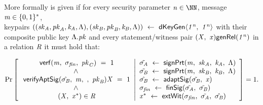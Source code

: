 \begin{definition}[\cnstAptSigCorrectness]
    \label{def:aptSigCorrectness}
    More formally \cnstAptSigCorrectness is given if for every security parameter $\varN \in \cnstNatural$, message $\mathit{m} \in \{0,1\}^{*}$, \\ keypairs
    $((\mathit{sk}_{\mathit{A}}, \mathit{pk}_{\mathit{A}}, \mathit{\mathit{k}_{\mathit{A}}}, \Lambda), (\mathit{sk}_{\mathit{B}}, \mathit{pk}_{\mathit{B}}, \mathit{\mathit{k}_{\mathit{B}}}, \Lambda)) ~\leftarrow~ \mathsf{dKeyGen}\langle \mathit{1^n} ,~ \mathit{1^n} \rangle$
    with their composite public key $\Lambda.\mathit{pk}$
    and every statement/witness pair $(\mathit{X} ,~ \mathit{x}) \mathsf{genRel}(\mathit{1^n})$ in a relation $\mathit{R}$ it must hold that:

    \[
        \Pr\left[
        \begin{array}{c}
            \:\mathsf{verf}(\mathit{m} ,~ \sigma_{\mathit{fin}} ,~ \mathit{pk}_{\mathit{C}}) ~=~ 1                                         \\
            ~\land~                                                                                              \\
            \: \mathsf{verifyAptSig}(\hat{\sigma_{\mathit{B}}} ,~ \mathit{m} ,~  ,~ \mathit{pk}_{\mathit{B}}){\mathit{X}} ~=~ 1             \\
            ~\land~                                                                                              \\
            \:(\mathit{X} ,~ \mathit{x}^*) \in \mathit{R}
        \end{array}
        \middle\vert
        \begin{array}{l}
            \tilde{\sigma_{\mathit{A}}} ~\leftarrow~ \mathsf{signPrt}(\mathit{m} ,~ \mathit{sk}_{\mathit{A}} ,~ \mathit{\mathit{k}_{\mathit{A}}} ,~ \Lambda)        \\
            \tilde{\sigma_{\mathit{B}}} ~\leftarrow~ \mathsf{signPrt}(\mathit{m} ,~ \mathit{sk}_{\mathit{B}} ,~ \mathit{\mathit{k}_{\mathit{B}}} ,~ \Lambda)              \\
            \hat{\sigma_{\mathit{B}}} ~\leftarrow~ \mathsf{adaptSig}(\tilde{\sigma_{\mathit{B}}} ,~ \mathit{x})                                             \\
            \sigma_{\mathit{fin}} ~\leftarrow~ \mathsf{finSig}(\tilde{\sigma_{\mathit{A}}} ,~ \tilde{\sigma_{\mathit{B}}})                                           \\
            \mathit{x}^* ~\leftarrow~ \mathsf{extWit}(\sigma_{\mathit{fin}} ,~ \tilde{\sigma_{\mathit{A}}} ,~ \hat{\sigma_{\mathit{B}}})
        \end{array}
        \right]=1.
    \]
\end{definition}

